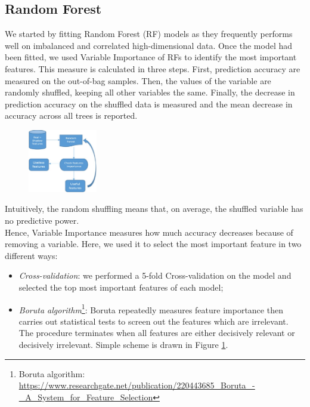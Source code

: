 \documentclass[a4paper,11pt, oneside]{article}  %
\begin{document}
\subsection{Random Forest}
We started by fitting Random Forest (RF) models as they frequently performs well on imbalanced and correlated high-dimensional data.  Once the model had been fitted,  we used Variable Importance of RFs to identify the most important features. This measure is calculated in three steps. First, prediction accuracy are measured on the out-of-bag samples. Then, the values of the variable are randomly shuffled, keeping all other variables the same. Finally, the decrease in prediction accuracy on the shuffled data is measured and the mean decrease in accuracy across all trees is reported. 

\begin{figure}
	\includegraphics[width=0.27\textwidth]{Boruta-Algorithm.jpg}
	\label{fig2}
\end{figure}
Intuitively, the random shuffling means that, on average, the shuffled variable has no predictive power. \\
Hence, Variable Importance measures how much accuracy decreases because of removing a variable. Here, we used it to select the most important feature in two different ways:
\begin{itemize}
	\item \textit{Cross-validation}: we performed a 5-fold Cross-validation on the model and selected the top most important features of each model; %
	\item \textit{Boruta algorithm}\footnote{Boruta algorithm: \url{https://www.researchgate.net/publication/220443685_Boruta_-_A_System_for_Feature_Selection}}: Boruta repeatedly measures feature importance then carries out statistical tests to screen out the features which are irrelevant. The procedure terminates when all features are either decisively relevant or decisively irrelevant. Simple scheme is drawn in Figure \ref{fig2}. 
\end{itemize} 
\end{document}
